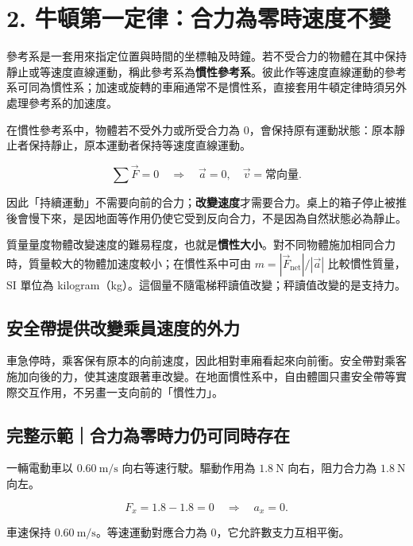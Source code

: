 \documentclass[11pt,a4paper]{article}
\begin{document}
\section{2. 牛頓第一定律：合力為零時速度不變}\label{ux725bux9813ux7b2cux4e00ux5b9aux5f8bux5408ux529bux70baux96f6ux6642ux901fux5ea6ux4e0dux8b8a}

參考系是一套用來指定位置與時間的坐標軸及時鐘。若不受合力的物體在其中保持靜止或等速度直線運動，稱此參考系為\textbf{慣性參考系}。彼此作等速度直線運動的參考系可同為慣性系；加速或旋轉的車廂通常不是慣性系，直接套用牛頓定律時須另外處理參考系的加速度。

在慣性參考系中，物體若不受外力或所受合力為 0，會保持原有運動狀態：原本靜止者保持靜止，原本運動者保持等速度直線運動。

\[
\sum\vec F=0
\quad\Rightarrow\quad
\vec a=0,
\quad
\vec v=\text{常向量}.
\]

因此「持續運動」不需要向前的合力；\textbf{改變速度}才需要合力。桌上的箱子停止被推後會慢下來，是因地面等作用仍使它受到反向合力，不是因為自然狀態必為靜止。

質量量度物體改變速度的難易程度，也就是\textbf{慣性大小}。對不同物體施加相同合力時，質量較大的物體加速度較小；在慣性系中可由 \(m=|\vec F_{\mathrm{net}}|/|\vec a|\) 比較慣性質量，SI 單位為 kilogram（kg）。這個量不隨電梯秤讀值改變；秤讀值改變的是支持力。

\subsection{安全帶提供改變乘員速度的外力}\label{ux5b89ux5168ux5e36ux63d0ux4f9bux6539ux8b8aux4e58ux54e1ux901fux5ea6ux7684ux5916ux529b}

車急停時，乘客保有原本的向前速度，因此相對車廂看起來向前衝。安全帶對乘客施加向後的力，使其速度跟著車改變。在地面慣性系中，自由體圖只畫安全帶等實際交互作用，不另畫一支向前的「慣性力」。

\begin{HandoutWorkedExample}

\subsection{完整示範｜合力為零時力仍可同時存在}\label{ux5b8cux6574ux793aux7bc4ux5408ux529bux70baux96f6ux6642ux529bux4ecdux53efux540cux6642ux5b58ux5728}

一輛電動車以 \(0.60\ \mathrm{m/s}\) 向右等速行駛。驅動作用為 \(1.8\ \mathrm N\) 向右，阻力合力為 \(1.8\ \mathrm N\) 向左。

\[
F_x=1.8-1.8=0
\quad\Rightarrow\quad
a_x=0.
\]

車速保持 \(0.60\ \mathrm{m/s}\)。等速運動對應合力為 0，它允許數支力互相平衡。

\end{HandoutWorkedExample}
\end{document}
